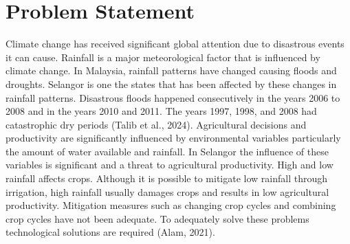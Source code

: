\documentclass[12pt]{article}
\begin{document}
\section{Problem Statement}
\label{sec:problem_statement}
Climate change has received significant global attention due to disastrous events it can cause. Rainfall is a major meteorological factor that is influenced by climate change. In Malaysia, rainfall patterns have changed causing floods and droughts. Selangor is one the states that has been affected by these changes in rainfall patterns. Disastrous floods happened consecutively in the years 2006 to 2008 and in the years 2010 and 2011. The years 1997, 1998, and 2008 had catastrophic dry periods (Talib et al., 2024). Agricultural decisions and productivity are significantly influenced by environmental variables particularly the amount of water available and rainfall. In Selangor the influence of these variables is significant and a threat to agricultural productivity. High and low rainfall affects crops. Although it is possible to mitigate low rainfall through irrigation, high rainfall usually damages crops and results in low agricultural productivity. Mitigation measures such as changing crop cycles and combining crop cycles have not been adequate. To adequately solve these problems technological solutions are required (Alam, 2021).
\end{document}
